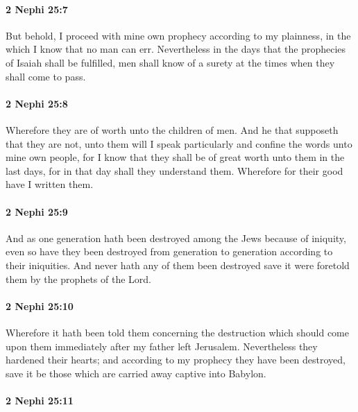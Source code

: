 		\paragraph{2 Nephi 25:7} %
			\label{2NEPHI-25-7}

			But behold, I proceed with mine own prophecy according to my plainness,
			in the which I know that no man can err.
			Nevertheless in the days that the prophecies of Isaiah shall be fulfilled,
			men shall know of a surety at the times when they shall come to pass.

		\paragraph{2 Nephi 25:8} %
			\label{2NEPHI-25-8}

			Wherefore they are of worth unto the children of men.
			And he that supposeth that they are not,
			unto them will I speak particularly
			and confine the words unto mine own people,
			for I know that they shall be of great worth unto them in the last days,
			for in that day shall they understand them.
			Wherefore for their good have I written them.

		\paragraph{2 Nephi 25:9} %
			\label{2NEPHI-25-9}

			And as one generation hath been destroyed among the Jews because of iniquity,
			even so have they been destroyed
			from generation to generation according to their iniquities.
			And never hath any of them been destroyed
			save it were foretold them by the prophets of the Lord.

		\paragraph{2 Nephi 25:10} %
			\label{2NEPHI-25-10}

			Wherefore it hath been told them concerning the destruction
			which should come upon them immediately after my father left Jerusalem.
			Nevertheless they hardened their hearts;
			and according to my prophecy they have been destroyed,
			save it be those which are carried away captive into Babylon.

		\paragraph{2 Nephi 25:11} %
			\label{2NEPHI-25-11}

